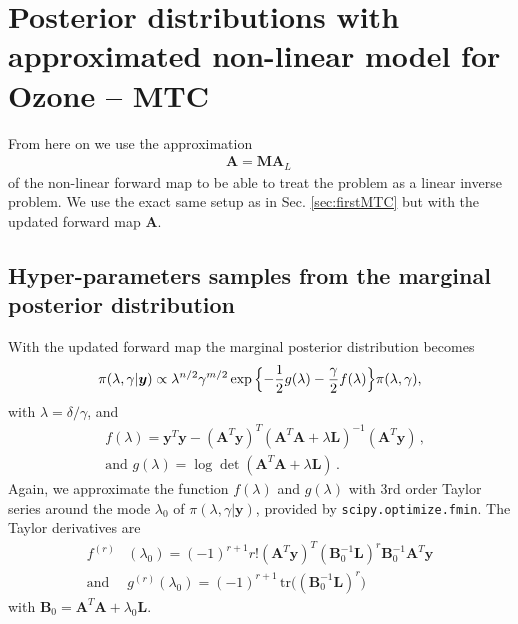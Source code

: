 \section{Posterior distributions with approximated non-linear model for Ozone -- MTC}
From here on we use the approximation
\begin{align}
	 \bm{A} =  \bm{M A}_L \, 
\end{align}
of the non-linear forward map to be able to treat the problem as a linear inverse problem.
We use the exact same setup as in Sec. \ref{sec:firstMTC} but with the updated forward map $\bm{A}$.

\subsection{Hyper-parameters samples from the marginal posterior distribution}
With the updated forward map the marginal posterior distribution becomes
\begin{align}
	\pi(\lambda, \gamma | \bm{y})
	\propto  \lambda^{n/2} \gamma^{m/2}   \exp{ \Bigl\{ - \frac{1}{2} g ( \lambda) - \frac{\gamma}{2} f ( \lambda) \Bigr\} } \pi(\lambda, \gamma),
	\label{eq:UpdMargPostAppl}
\end{align}
with $\lambda = \delta / \gamma$, and
\begin{subequations}
	\label{eq:Updfandg}
	\begin{align}
		&f ( \lambda) = \bm{y}^T \bm{y} - (\bm{A}^T \bm{y})^T (\bm{A}^T  \bm{A} + \lambda \bm{L})^{-1} (\bm{A}^T \bm{y})  \, ,  \\
		&\text{and } g(\lambda) = \log \det (\bm{A}^T  \bm{A} + \lambda \bm{L}) \, .
	\end{align}
\end{subequations}
Again, we approximate the function $f(\lambda)$ and $g(\lambda)$ with 3rd order Taylor series around the mode $\lambda_0$ of $\pi(\lambda, \gamma | \bm{y})$, provided by \texttt{scipy.optimize.fmin}.
The Taylor derivatives are
\begin{align}
	f^{(r)}& (\lambda_0)= (-1)^{r+1} r! (\bm{A}^T \bm{y})^T (\bm{B}_0^{-1} \bm{L})^r \bm{B}_0^{-1} \bm{A}^T \bm{y} \label{eq:Updftay}  \\
	\text{and } &g^{(r)} ( \lambda_0) = (-1)^{r+1} \, \text{tr} \big( (\bm{B}_0^{-1}\bm{L})^r \big)
	\label{eq:Updgtay}
\end{align} 
with $\bm{B}_0 = \bm{A}^T  \bm{A} + \lambda_0 \bm{L}$.

